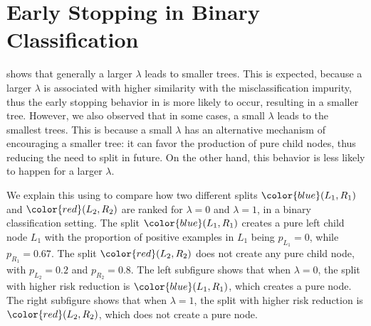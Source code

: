 \documentclass[letterpaper]{article} %
\newcommand{\bp}{{\bm{p}}}
\newcommand{\bn}{{\bm{n}}}
\newcommand{\T}{{\mathsf{T}}}
\newcommand{\I}{\mathds{1}}
\newcommand{\cS}{{\cal{S}}}
\begin{document}


\section{Early Stopping in Binary Classification}
\label{app:alternate_early_stopping}

 shows that generally a larger $\lambda$ leads to smaller trees.
This is expected, because a larger $\lambda$ is associated with higher similarity with the
misclassification impurity, thus the early stopping behavior in 
is more likely to occur, resulting in a smaller tree.
However, we also observed that in some cases, a small $\lambda$ leads to the smallest trees.
This is because a small $\lambda$ has an alternative mechanism of encouraging a smaller tree:
it can favor the production of pure child nodes,
thus reducing the need to split in future.
On the other hand, this behavior is less likely to happen for a larger $\lambda$.

We explain this using  to compare how two different splits
${\color{blue}(L_{1}, R_{1})}$ and ${\color{red}(L_{2}, R_{2})}$
are ranked for $\lambda=0$ and $\lambda=1$, in a binary classification setting.
The split ${\color{blue}(L_{1}, R_{1})}$  creates a pure left child node $L_{1}$ with the proportion of positive
examples in $L_{1}$ being $p_{L_{1}} = 0$, while $p_{R_{1}} = 0.67$.
The split ${\color{red}(L_{2}, R_{2})}$ does not create any pure child node, with
$p_{L_{2}} = 0.2$ and $p_{R_{2}} = 0.8$.
The left subfigure shows that when $\lambda=0$, the split with higher risk reduction is ${\color{blue}(L_{1}, R_{1})}$,
which creates a pure node.
The right subfigure shows that when $\lambda=1$, the split with higher risk reduction is ${\color{red}(L_{2}, R_{2})}$,
which does not create a pure node.
\end{document}
